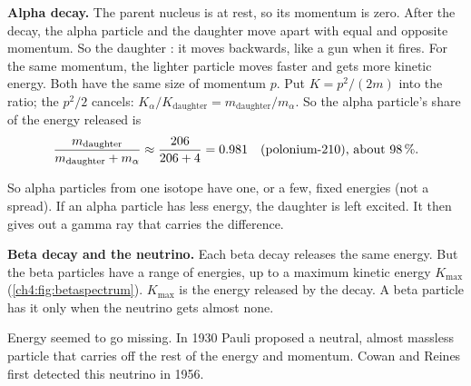 \textbf{Alpha decay.} The parent nucleus is at rest, so its momentum is zero. After
the decay, the alpha particle and the daughter move apart with equal and opposite
momentum. So the daughter : it moves backwards, like a gun when it
fires. For the same momentum, the lighter particle moves faster and gets more
kinetic energy. Both have the same size of momentum $p$. Put $K = p^2/(2m)$ into
the ratio; the $p^2/2$ cancels: $K_\alpha / K_\mathrm{daughter} =
m_\mathrm{daughter} / m_\alpha$. So the alpha particle's share of the energy released is
\[
  \frac{m_\mathrm{daughter}}{m_\mathrm{daughter} + m_\alpha}
  \approx \frac{206}{206 + 4} = 0.981 \quad \text{(polonium-210), about \qty{98}{\percent}.}
\]

So alpha particles from one isotope have one, or a few, fixed energies (not a
spread). If an alpha particle has less energy, the daughter is left excited. It then
gives out a gamma ray that carries the difference.

\begin{sidebyside}[0.42]
  \centering
  \label{ch4:fig:betaspectrum}
\nextside
  \textbf{Beta decay and the neutrino.} Each beta decay releases the same energy. But
  the beta particles have a range of energies, up to a maximum kinetic energy
  $K_\mathrm{max}$ (\cref{ch4:fig:betaspectrum}). $K_\mathrm{max}$ is the energy
  released by the decay. A beta particle has it only when the neutrino gets almost
  none.\par\smallskip
  Energy seemed to go missing. In 1930 Pauli proposed a neutral, almost massless
  particle that carries off the rest of the energy and momentum. Cowan and Reines
  first detected this neutrino in 1956.
\end{sidebyside}

